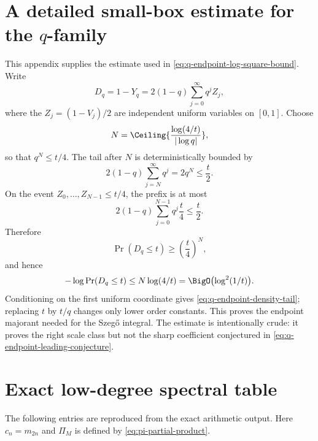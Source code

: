 \documentclass[11pt,oneside]{article}
\theoremstyle{definition}
\theoremstyle{remark}
\numberwithin{equation}{section}
\begin{document}
\appendix

\section{A detailed small-box estimate for the \texorpdfstring{$q$}{q}-family}
\label{app:q-small-box}

This appendix supplies the estimate used in
\cref{eq:q-endpoint-log-square-bound}.  Write
\begin{equation}
 D_q=1-Y_q=2(1-q)\sum_{j=0}^{\infty}q^jZ_j,
 \label{eq:q-deficit}
\end{equation}
where the $Z_j=(1-V_j)/2$ are independent uniform variables on $[0,1]$.
Choose
\begin{equation}
 N=\Ceiling{\frac{\log(4/t)}{|\log q|}},
 \label{eq:q-small-box-N}
\end{equation}
so that $q^N\le t/4$.  The tail after $N$ is deterministically bounded by
\begin{equation}
 2(1-q)\sum_{j=N}^{\infty}q^j=2q^N\le\frac t2.
 \label{eq:q-tail-bound}
\end{equation}
On the event $Z_0,\ldots,Z_{N-1}\le t/4$, the prefix is at most
\begin{equation}
 2(1-q)\sum_{j=0}^{N-1}q^j\frac t4\le\frac t2.
 \label{eq:q-prefix-bound}
\end{equation}
Therefore
\begin{equation}
 \Pr(D_q\le t)\ge\left(\frac t4\right)^N,
 \label{eq:q-small-ball-lower}
\end{equation}
and hence
\begin{equation}
 -\log\Pr(D_q\le t)
 \le N\log(4/t)=\BigO\bigl(\log^2(1/t)\bigr).
 \label{eq:q-small-ball-log-square}
\end{equation}
Conditioning on the first uniform coordinate gives
\cref{eq:q-endpoint-density-tail}; replacing $t$ by $t/q$ changes only lower
order constants.  This proves the endpoint majorant needed for the
Szeg\H{o} integral.  The estimate is intentionally crude: it proves the right
scale class but not the sharp coefficient conjectured in
\cref{eq:q-endpoint-leading-conjecture}.

\section{Exact low-degree spectral table}
\label{app:exact-table}

The following entries are reproduced from the exact arithmetic output.  Here
$c_n=m_{2n}$ and $\Pi_M$ is defined by \cref{eq:pi-partial-product}.
\end{document}
